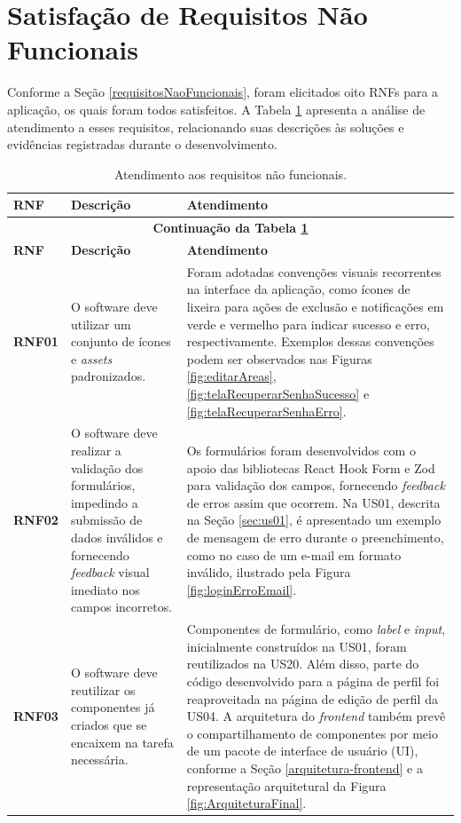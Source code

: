 \section [Satisfação de Requisitos Não Funcionais]{Satisfação de Requisitos Não Funcionais}

Conforme a Seção \ref{requisitosNaoFuncionais}, foram elicitados oito RNFs para a aplicação, os quais foram todos satisfeitos. A Tabela \ref{tab:satisfacao-rnf} apresenta a análise de atendimento a esses requisitos, relacionando suas descrições às soluções e evidências registradas durante o desenvolvimento.

\begin{longtable}{p{1.35cm}p{4.75cm}p{8.1cm}}
\caption{Atendimento aos requisitos não funcionais.\label{tab:satisfacao-rnf}} \\
\toprule
\textbf{RNF} & \textbf{Descrição} & \textbf{Atendimento} \\
\midrule
\endfirsthead

\multicolumn{3}{c}{\textbf{Continuação da Tabela \ref{tab:satisfacao-rnf}}} \\
\toprule
\textbf{RNF} & \textbf{Descrição} & \textbf{Atendimento} \\
\midrule
\endhead

\bottomrule
\endfoot

\textbf{RNF01} & O software deve utilizar um conjunto de ícones e \textit{assets} padronizados. &
Foram adotadas convenções visuais recorrentes na interface da aplicação, como ícones de lixeira para ações de exclusão e notificações em verde e vermelho para indicar sucesso e erro, respectivamente. Exemplos dessas convenções podem ser observados nas Figuras \ref{fig:editarAreas}, \ref{fig:telaRecuperarSenhaSucesso} e \ref{fig:telaRecuperarSenhaErro}. \\
\midrule

\textbf{RNF02} & O software deve realizar a validação dos formulários, impedindo a submissão de dados inválidos e fornecendo \textit{feedback} visual imediato nos campos incorretos. &
Os formulários foram desenvolvidos com o apoio das bibliotecas React Hook Form e Zod para validação dos campos, fornecendo \textit{feedback} de erros assim que ocorrem. Na US01, descrita na Seção \ref{sec:us01}, é apresentado um exemplo de mensagem de erro durante o preenchimento, como no caso de um e-mail em formato inválido, ilustrado pela Figura \ref{fig:loginErroEmail}. \\
\midrule

\textbf{RNF03} & O software deve reutilizar os componentes já criados que se encaixem na tarefa necessária. &
Componentes de formulário, como \textit{label} e \textit{input}, inicialmente construídos na US01, foram reutilizados na US20. Além disso, parte do código desenvolvido para a página de perfil foi reaproveitada na página de edição de perfil da US04. A arquitetura do \textit{frontend} também prevê o compartilhamento de componentes por meio de um pacote de interface de usuário (UI), conforme a Seção \ref{arquitetura-frontend} e a representação arquitetural da Figura \ref{fig:ArquiteturaFinal}. \\
\midrule


\end{longtable}
